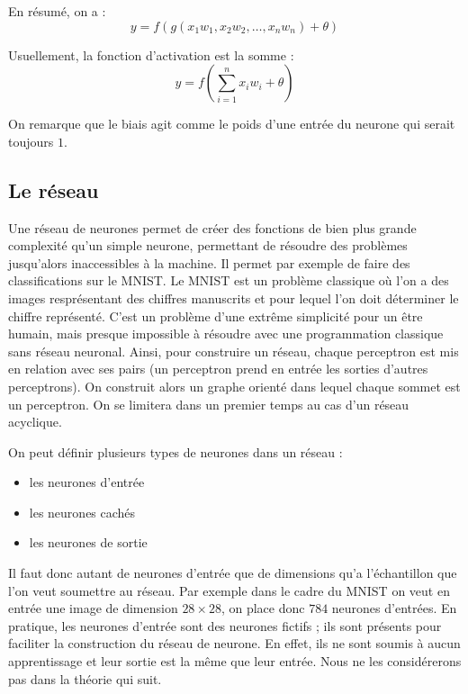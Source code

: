 \medskip

En résumé, on a :
\[y = f(g(x_1w_1, x_2w_2, \ldots , x_nw_n) + \theta) \]

\medskip

Usuellement, la fonction d'activation est la somme :
\[y = f(\sum_{i=1}^n x_iw_i + \theta) \]

\medskip

On remarque que le biais agit comme le poids d'une entrée du neurone qui serait
toujours $1$.

\subsection{Le réseau}

Une réseau de neurones permet de créer des fonctions de bien plus grande
complexité qu'un simple neurone, permettant de résoudre des problèmes
jusqu'alors inaccessibles à la machine. Il permet par exemple de faire des
classifications sur le MNIST. Le MNIST est un problème classique où l'on a des
images resprésentant des chiffres manuscrits et pour lequel l'on doit déterminer
le chiffre représenté. C'est un problème d'une extrême simplicité pour un être
humain, mais presque impossible à résoudre avec une programmation classique
sans réseau neuronal. Ainsi, pour construire un réseau, chaque perceptron est
mis en relation avec ses pairs (un perceptron prend en entrée les sorties
d'autres perceptrons). On construit alors un graphe orienté dans lequel chaque
sommet est un perceptron. On se limitera dans un premier temps au cas d'un
réseau acyclique.

\bigskip

On peut définir plusieurs types de neurones dans un réseau :
\begin{itemize}
\item les neurones d'entrée
\item les neurones cachés
\item les neurones de sortie
\end{itemize}

\bigskip

Il faut donc autant de neurones d'entrée que de dimensions qu'a l'échantillon
que l'on veut soumettre au réseau. Par exemple dans le cadre du MNIST
on veut en entrée une image de dimension $28 \times 28$, on place donc $784$
neurones d'entrées. En pratique, les neurones d'entrée sont des neurones fictifs
; ils sont présents pour faciliter la construction du réseau de neurone.
En effet, ils ne sont soumis à aucun apprentissage et leur sortie est la même
que leur entrée. Nous ne les considérerons pas dans la théorie qui suit.

